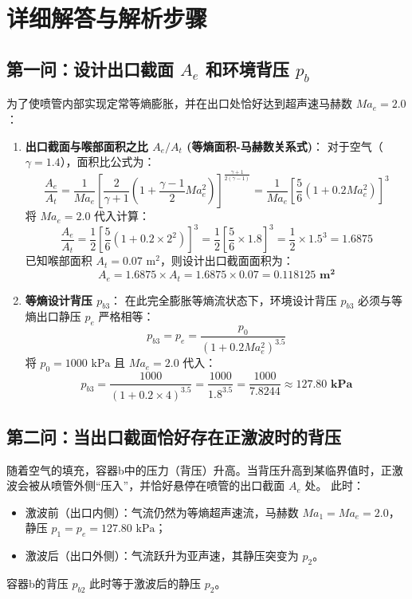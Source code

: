 \documentclass[11pt,a4paper]{article}
\begin{document}
\newpage

\section{详细解答与解析步骤}

\subsection{第一问：设计出口截面 $A_e$ 和环境背压 $p_b$}
为了使喷管内部实现定常等熵膨胀，并在出口处恰好达到超声速马赫数 $Ma_e = 2.0$：
\begin{enumerate}
    \item \textbf{出口截面与喉部面积之比 $A_e / A_t$ (等熵面积-马赫数关系式)}：
    对于空气（$\gamma = 1.4$），面积比公式为：
    \begin{equation}
        \frac{A_e}{A_t} = \frac{1}{Ma_e} \left[ \frac{2}{\gamma + 1} \left( 1 + \frac{\gamma - 1}{2} Ma_e^2 \right) \right]^{\frac{\gamma + 1}{2(\gamma - 1)}} = \frac{1}{Ma_e} \left[ \frac{5}{6} \left( 1 + 0.2 Ma_e^2 \right) \right]^3
    \end{equation}
    将 $Ma_e = 2.0$ 代入计算：
    \begin{equation}
        \frac{A_e}{A_t} = \frac{1}{2} \left[ \frac{5}{6} \left( 1 + 0.2 \times 2^2 \right) \right]^3 = \frac{1}{2} \left[ \frac{5}{6} \times 1.8 \right]^3 = \frac{1}{2} \times 1.5^3 = 1.6875
    \end{equation}
    已知喉部面积 $A_t = 0.07\text{ m}^2$，则设计出口截面面积为：
    \begin{equation}
        A_e = 1.6875 \times A_t = 1.6875 \times 0.07 = \mathbf{0.118125\text{ m}^2}
    \end{equation}

    \item \textbf{等熵设计背压 $p_{b3}$}：
    在此完全膨胀等熵流状态下，环境设计背压 $p_{b3}$ 必须与等熵出口静压 $p_e$ 严格相等：
    \begin{equation}
        p_{b3} = p_e = \frac{p_0}{\left(1 + 0.2 Ma_e^2\right)^{3.5}}
    \end{equation}
    将 $p_0 = 1000\text{ kPa}$ 且 $Ma_e = 2.0$ 代入：
    \begin{equation}
        p_{b3} = \frac{1000}{(1 + 0.2 \times 4)^{3.5}} = \frac{1000}{1.8^{3.5}} = \frac{1000}{7.8244} \approx \mathbf{127.80\text{ kPa}}
    \end{equation}
\end{enumerate}

\subsection{第二问：当出口截面恰好存在正激波时的背压}
随着空气的填充，容器b中的压力（背压）升高。当背压升高到某临界值时，正激波会被从喷管外侧“压入”，并恰好悬停在喷管的出口截面 $A_e$ 处。
此时：
\begin{itemize}
    \item 激波前（出口内侧）：气流仍然为等熵超声速流，马赫数 $Ma_1 = Ma_e = 2.0$，静压 $p_1 = p_e = 127.80\text{ kPa}$；
    \item 激波后（出口外侧）：气流跃升为亚声速，其静压突变为 $p_2$。
\end{itemize}
容器b的背压 $p_{b2}$ 此时等于激波后的静压 $p_2$。
\end{document}
